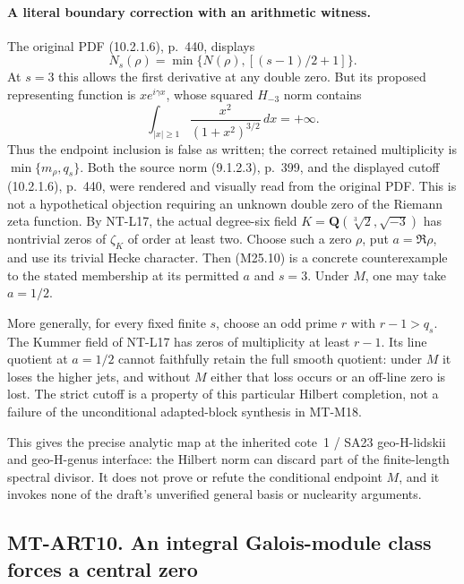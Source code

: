 \documentclass[11pt,a4paper]{article}
\begin{document}
\paragraph{A literal boundary correction with an arithmetic witness.}
The original PDF (10.2.1.6), p.~440, displays
\[
 N_s(\rho)=\min\{N(\rho),[(s-1)/2+1]\}.
\]
At $s=3$ this allows the first derivative at any double zero.
But its proposed representing function is
$x e^{i\gamma x}$, whose squared $H_{-3}$ norm contains
\[
              \int_{|x|\ge1}\frac{x^2}{(1+x^2)^{3/2}}\,dx
                         =+\infty.
 \tag{M25.10}
\]
Thus the endpoint inclusion is false as written; the
correct retained multiplicity is
$\min\{m_\rho,q_s\}$. Both the source norm (9.1.2.3),
p.~399, and the displayed cutoff (10.2.1.6), p.~440, were
rendered and visually read from the original PDF.
This is not a hypothetical objection requiring an unknown
double zero of the Riemann zeta function. By NT-L17,
the actual degree-six field
$K=\mathbf Q(\sqrt[3]{2},\sqrt{-3})$ has nontrivial zeros
of $\zeta_K$ of order at least two. Choose such a zero
$\rho$, put $a=\Re\rho$, and use its trivial Hecke
character. Then (M25.10) is a concrete counterexample
to the stated membership at its permitted $a$ and $s=3$.
Under $M$, one may take $a=1/2$.

More generally, for every fixed finite $s$, choose an odd
prime $r$ with $r-1>q_s$. The Kummer field of NT-L17
has zeros of multiplicity at least $r-1$. Its line quotient
at $a=1/2$ cannot faithfully retain the full smooth
quotient: under $M$ it loses the higher jets, and without
$M$ either that loss occurs or an off-line zero is lost.
The strict cutoff is a property of this particular
Hilbert completion, not a failure of the unconditional
adapted-block synthesis in MT-M18.

This gives the precise analytic map at the inherited
cote~1 / SA23 geo-H-lidskii and geo-H-genus interface:
the Hilbert norm can discard part of the finite-length
spectral divisor. It does not prove or refute the
conditional endpoint $M$, and it invokes none of the
draft's unverified general basis or nuclearity arguments.

\subsection*{MT-ART10. An integral Galois-module class forces a central zero}
\end{document}
